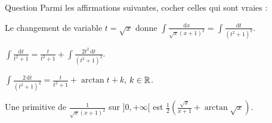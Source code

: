 \begin{multi}[multiple,feedback=
{Avec \(\displaystyle t=\sqrt{x}\), on a : \(\displaystyle x=t^2\Rightarrow \mathrm{d}x=2t\, \mathrm{d}t\) et \(\displaystyle \int \frac{\mathrm{d}x}{\sqrt{x}(x+1)^2}=\int \frac{2\, \mathrm{d}t}{(t^2+1)^2}\).
Une intégration par parties avec \(\displaystyle u=\frac{1}{t^2+1}\) et \(v=t\) donne
\[\int \frac{\mathrm{d}t}{t^2+1}=\frac{t}{t^2+1}+\int \frac{2t^2\, \mathrm{d}t}{(t^2+1)^2}=\frac{t}{t^2+1}+\int \frac{2\, \mathrm{d}t}{t^2+1}-\int \frac{2\, \mathrm{d}t}{(t^2+1)^2}.\]
D'où \(\displaystyle \int \frac{2\, \mathrm{d}t}{(t^2+1)^2}=\frac{t}{t^2+1}+\arctan t+k\Rightarrow \int \frac{\mathrm{d}x}{\sqrt{x}(x+1)^2}=\frac{\sqrt{x}}{x+1}+\arctan \sqrt{x}+k\), \(k\in \Rr\).
}]{Question}
Parmi les affirmations suivantes, cocher celles qui sont vraies :

    \item Le changement de variable \(\displaystyle t=\sqrt{x}\) donne \(\displaystyle \int \frac{\mathrm{d}x}{\sqrt{x}(x+1)^2}=\int \frac{\mathrm{d}t}{(t^2+1)^2}\).
    \item* \(\displaystyle \int \frac{\mathrm{d}t}{t^2+1}=\frac{t}{t^2+1}+\int \frac{2t^2\, \mathrm{d}t}{(t^2+1)^2}\).
    \item* \(\displaystyle \int \frac{2\, \mathrm{d}t}{(t^2+1)^2}=\frac{t}{t^2+1}+\arctan t+k\), \(k\in \Rr\).
    \item Une primitive de \(\displaystyle \frac{1}{\sqrt{x}(x+1)^2}\) sur \(]0,+\infty[\) est \(\displaystyle \frac{1}{2}\left(\frac{\sqrt{x}}{x+1}+\arctan \sqrt{x}\right)\).
\end{multi}


